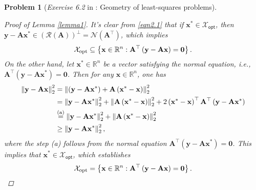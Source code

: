\documentclass[11pt]{article}
\newtheorem{problem}{Problem}
\numberwithin{equation}{problem}
\begin{document}
\begin{problem} [\emph{Exercise 6.2} in \cite{calafiore2014optimization}: Geometry of least-squares problems]
{\begin{proof} [Proof of Lemma \ref{lemma1}]
It's clear from \eqref{eqn2.1} that if $\mathbf{x}^* \in \mathcal{X}_{\textsf{opt}}$, then $\mathbf{y} - \mathbf{A} \mathbf{x}^* \in \left( \mathcal{R} (\mathbf{A}) \right)^{\perp} = \mathcal{N} \left( \mathbf{A}^{\top} \right)$, which implies
\begin{equation*}
    \mathcal{X}_{\textsf{\textnormal{opt}}} \subseteq \left\{ \mathbf{x} \in \mathbb{R}^n : \mathbf{A}^{\top} \left( \mathbf{y} - \mathbf{A} \mathbf{x} \right) = \mathbf{0} \right\}.
\end{equation*}
On the other hand, let $\mathbf{x}^* \in \mathbb{R}^n$ be a vector satisfying the normal equation, \emph{i.e.}, $\mathbf{A}^{\top} \left( \mathbf{y} - \mathbf{A} \mathbf{x}^* \right) = \mathbf{0}$. Then for any $\mathbf{x} \in \mathbb{R}^n$, one has
\begin{equation*}
    \begin{split}
        \left\| \mathbf{y} - \mathbf{A} \mathbf{x} \right\|_{2}^2 &=
        \left\| \left( \mathbf{y} - \mathbf{A} \mathbf{x}^* \right) + \mathbf{A} \left( \mathbf{x}^* - \mathbf{x} \right) \right\|_{2}^2 \\
        &= \left\| \mathbf{y} - \mathbf{A} \mathbf{x}^* \right\|_{2}^2 + \left\| \mathbf{A} \left( \mathbf{x}^* - \mathbf{x} \right) \right\|_{2}^2 + 2 \left( \mathbf{x}^* - \mathbf{x} \right)^{\top} \mathbf{A}^{\top} \left( \mathbf{y} - \mathbf{A} \mathbf{x}^* \right) \\
        &\stackrel{\textnormal{(a)}}{=} \left\| \mathbf{y} - \mathbf{A} \mathbf{x}^* \right\|_{2}^2 + \left\| \mathbf{A} \left( \mathbf{x}^* - \mathbf{x} \right) \right\|_{2}^2 \\
        &\geq \left\| \mathbf{y} - \mathbf{A} \mathbf{x}^* \right\|_{2}^2,
    \end{split}
\end{equation*}
where the step (a) follows from the normal equation $\mathbf{A}^{\top} \left( \mathbf{y} - \mathbf{A} \mathbf{x}^* \right) = \mathbf{0}$. This implies that $\mathbf{x}^* \in \mathcal{X}_{\textsf{opt}}$, which establishes
\begin{equation}
    \label{eqn2.4}
    \mathcal{X}_{\textsf{\textnormal{opt}}} = \left\{ \mathbf{x} \in \mathbb{R}^n : \mathbf{A}^{\top} \left( \mathbf{y} - \mathbf{A} \mathbf{x} \right) = \mathbf{0} \right\}.
\end{equation}
\medskip


\end{proof}}
\end{problem}
\end{document}
